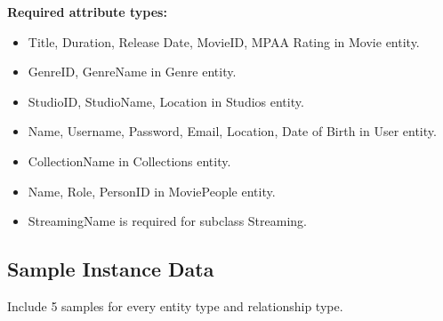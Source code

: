 \documentclass[12pt]{article}
\begin{document}
\textbf{Required attribute types:}
\begin{itemize}
    \item Title, Duration, Release Date, MovieID, MPAA Rating in Movie entity.
    \item GenreID, GenreName in Genre entity.
    \item StudioID, StudioName, Location in Studios entity.
    \item Name, Username, Password, Email, Location, Date of Birth in User entity. 
    \item CollectionName in Collections entity.
    \item Name, Role, PersonID in MoviePeople entity.
    \item StreamingName is required for subclass Streaming.
\end{itemize}

\subsection{Sample Instance Data}

Include 5 samples for every entity type and relationship type.
\end{document}
